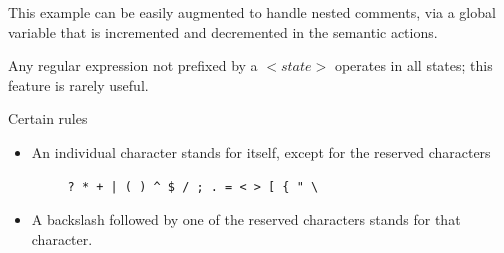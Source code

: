 \documentclass[8pt, a4paper, oneside, twocolumn]{extarticle}
\begin{document}
This example can be easily augmented to handle nested comments, via a 
global variable that is incremented and decremented in the semantic actions. 

Any regular expression not prefixed by a $<state>$ operates in all states; this  
feature is rarely useful. 

Certain rules
\begin{itemize}
    \item     An individual character stands for itself, except for the reserved characters 
    \begin{verbatim}
     ? * + | ( ) ^ $ / ; . = < > [ { " \

    \end{verbatim}

    \item A backslash followed by one of the reserved characters stands for that character. 


\end{itemize}
\end{document}
